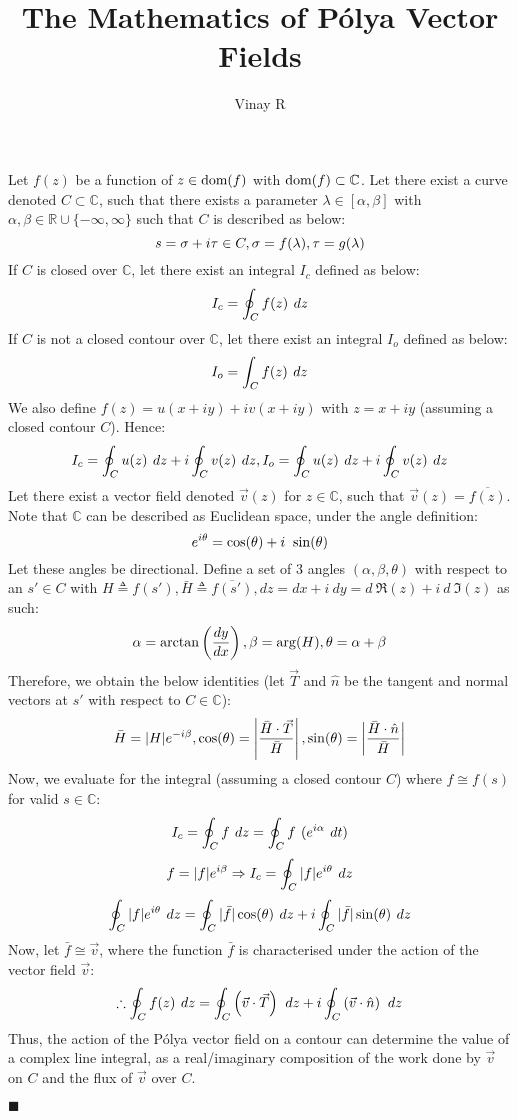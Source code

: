 \documentclass[12pt]{article}
\title{The Mathematics of Pólya Vector Fields}
\author{Vinay R}
\begin{document}
\maketitle

Let $f(z)$ be a function of $z \in \textup{dom}(f)$ with $\textup{dom}(f) \subset \mathbb{C}$.
Let there exist a curve denoted $C \subset \mathbb{C}$, such that there exists a parameter $\lambda \in [\alpha, \beta]$ with $\alpha,\beta \in \mathbb{R} \cup \{ -\infty, \infty \}$ such that $C$ is described as below:
$$\large s = \sigma + i\tau \in C, \sigma = f(\lambda), \tau = g(\lambda)$$
If $C$ is closed over $\mathbb{C}$, let there exist an integral $I_c$ defined as below:
$$\large I_c = \oint_C f(z)\ dz$$
If $C$ is not a closed contour over $\mathbb{C}$, let there exist an integral $I_o$ defined as below:
$$\large I_o = \int_C f(z)\ dz$$
We also define $f(z) = u(x + iy) + iv(x + iy)$ with $z = x + iy$ (assuming a closed contour $C$). Hence:
$$\large I_c = \oint_C u(z)\ dz + i \oint_C v(z)\ dz, I_o = \oint_C u(z)\ dz + i \oint_C v(z)\ dz$$
Let there exist a vector field denoted $\vec{v}(z)$ for $z \in \mathbb{C}$, such that $\vec{v}(z) = \overline{f(z)}$.
Note that $\mathbb{C}$ can be described as Euclidean space, under the angle definition:
$$\large e ^ {i\theta} = \cos(\theta) + i\ \sin(\theta)$$
Let these angles be directional. Define a set of 3 angles $(\alpha, \beta, \theta)$ with respect to an $s' \in C$ with $H \triangleq f(s'), \bar{H} \triangleq \overline{f(s')}, dz = dx + i\ dy = d\ \Re(z) + i\ d\ \Im(z)$ as such:
$$\large \alpha = \arctan\left(\frac{dy}{dx}\right), \beta = \arg(H), \theta = \alpha + \beta$$
Therefore, we obtain the below identities (let $\vec{T}$ and $\hat{n}$ be the tangent and normal vectors at $s'$ with respect to $C \in \mathbb{C}$):
$$\large \bar{H} = |H| e^{-i \beta}, \cos(\theta) = \left|\frac{\bar{H} \cdot \vec{T}}{\bar{H}}\right|, \sin(\theta) = \left|\frac{\bar{H} \cdot \hat{n}}{\bar{H}}\right|$$
Now, we evaluate for the integral (assuming a closed contour $C$) where $f \cong f(s)$ for valid $s \in \mathbb{C}$:
$$\large I_c = \oint_C f\ dz = \oint_C f\ (e^{i \alpha}\ dt)$$
$$\large f = |f|e^{i \beta} \Rightarrow I_c = \oint_C |f|e^{i \theta}\ dz$$
$$\large \oint_C |f|e^{i \theta}\ dz = \oint_C |\bar{f}| \cos(\theta)\ dz + i \oint_C |\bar{f}| \sin(\theta)\ dz$$
Now, let $\bar{f} \cong \vec{v}$, where the function $\bar{f}$ is characterised under the action of the vector field $\vec{v}$:
$$\large \therefore \oint_C f(z)\ dz = \oint_C \left(\vec{v} \cdot \vec{T} \right)\ dz + i \oint_C \left(\vec{v} \cdot \hat{n} \right)\ dz$$
Thus, the action of the Pólya vector field on a contour can determine the value of a complex line integral, as a real/imaginary composition of the work done by $\vec{v}$ on $C$ and the flux of $\vec{v}$ over $C$.
\begin{flushright} $\blacksquare$ \end{flushright}
\end{document}
